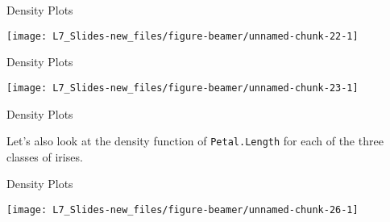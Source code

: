 \documentclass[ignorenonframetext,]{beamer}
\newenvironment{Shaded}{\begin{snugshade}}{\end{snugshade}}
\newcommand{\KeywordTok}[1]{\textcolor[rgb]{0.13,0.29,0.53}{\textbf{{#1}}}}
\newcommand{\DataTypeTok}[1]{\textcolor[rgb]{0.13,0.29,0.53}{{#1}}}
\newcommand{\StringTok}[1]{\textcolor[rgb]{0.31,0.60,0.02}{{#1}}}
\newcommand{\NormalTok}[1]{{#1}}
\begin{document}
\begin{frame}[fragile]{Density Plots}

\small

\begin{Shaded}
\end{Shaded}

\begin{center}\texttt{[image: L7\_Slides-new\_files/figure-beamer/unnamed-chunk-22-1]} \end{center}

\end{frame}

\begin{frame}[fragile]{Density Plots}

\small

\begin{Shaded}
\end{Shaded}

\begin{center}\texttt{[image: L7\_Slides-new\_files/figure-beamer/unnamed-chunk-23-1]} \end{center}

\end{frame}

\begin{frame}[fragile]{Density Plots}

Let's also look at the density function of \texttt{Petal.Length} for
each of the three classes of irises.

\small

\small

\end{frame}

\begin{frame}{Density Plots}

\small

\begin{center}\texttt{[image: L7\_Slides-new\_files/figure-beamer/unnamed-chunk-26-1]} \end{center}

\end{frame}
\end{document}
